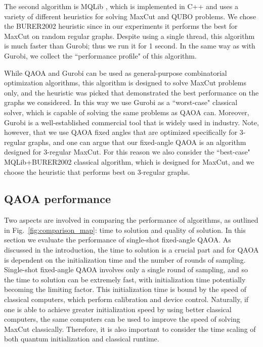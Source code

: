 The second algorithm is MQLib \cite{MQLib},
which is implemented in C++ and uses a variety of different heuristics
for solving MaxCut and QUBO problems.
We chose the BURER2002 heuristic since in our experiments it 
performs the best for MaxCut on random regular graphs.
Despite using a single thread, this algorithm is much faster than Gurobi; thus we run it for 1 second.
In the same way as with Gurobi, we collect the
``performance profile" of this algorithm.

While QAOA and Gurobi can be used as general-purpose combinatorial optimization algorithms, this algorithm is designed to
solve MaxCut problems only, and the heuristic was picked 
that demonstrated the best performance on the graphs we considered.
In this way we use Gurobi as a ``worst-case" classical solver,
which is capable of solving the same problems as QAOA can.
Moreover, Gurobi is a well-established commercial tool that is widely used in industry. 
Note, however, that we use QAOA fixed angles that are optimized specifically for 3-regular graphs, and one can argue
that our fixed-angle QAOA is an algorithm designed for 3-regular MaxCut.
For this reason we also consider the ``best-case" MQLib+BURER2002 classical algorithm, which is designed for MaxCut, and we choose the heuristic that performs best on 3-regular graphs.


\subsection{QAOA performance}\label{sec:QAOAperformance}

Two aspects are involved in  comparing the performance of algorithms, as outlined in Fig.~\ref{fig:comparison_map}: time to solution and quality of solution. In this section we evaluate the performance of single-shot fixed-angle QAOA. As discussed in the introduction, the time to solution is a crucial part and for QAOA is dependent on the initialization time and the number of rounds of sampling. Single-shot fixed-angle QAOA involves  only a single round of sampling, and so the time to solution can be extremely fast, with initialization time potentially becoming the limiting factor.
This initialization time is bound by the speed of classical computers, which perform calibration and device control. Naturally, if one is able to achieve greater initialization speed by using better classical computers, the same computers can be used to improve the speed of solving MaxCut classically. Therefore, it is also important to consider the time scaling of both quantum initialization and classical runtime.

